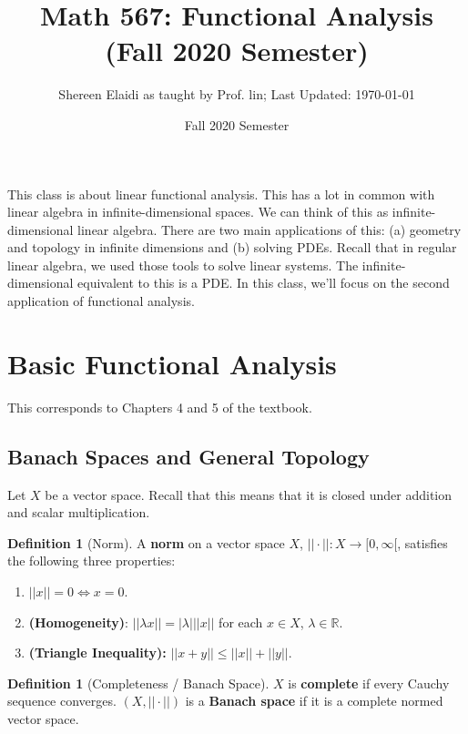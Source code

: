 \documentclass[psamsfonts]{amsart}
\title[Math 567: Functional Analysis]{Math 567: Functional Analysis (Fall 2020 Semester)}
\author{Shereen Elaidi as taught by Prof. lin; Last Updated: \today}
\date{Fall 2020 Semester}
\theoremstyle{definition}
\newtheorem{defn}[thm]{Definition}
\theoremstyle{remark}
\newcommand{\R}[0]{\mathbb{R}}
\numberwithin{equation}{section}
\begin{document}
\maketitle

This class is about linear functional analysis. This has a lot in common with linear algebra in infinite-dimensional spaces. We can think of this as infinite-dimensional linear algebra. There are two main applications of this: (a) geometry and topology in infinite dimensions and (b) solving PDEs. Recall that in regular linear algebra, we used those tools to solve linear systems. The infinite-dimensional equivalent to this is a PDE. In this class, we'll focus on the second application of functional analysis.


\section{Basic Functional Analysis}
This corresponds to Chapters 4 and 5 of the textbook.
\subsection{Banach Spaces and General Topology}
Let \( X \) be a vector space. Recall that this means that it is closed under addition and scalar multiplication. 

\begin{defn}[Norm]
	A \textbf{norm} on a vector space \( X \), \( || \cdot ||: X \rightarrow [0, \infty [ \), satisfies the following three properties: 
	\begin{enumerate}
		\item \( || x || = 0 \iff x = 0 \). 
		\item \textbf{(Homogeneity)}: \( || \lambda x || = |\lambda | || x || \) for each \( x \in X \), \( \lambda \in \R \).
		\item \textbf{(Triangle Inequality):} \( || x+y || \leq || x || + || y || \).
	\end{enumerate}
\end{defn}

\begin{defn}[Completeness / Banach Space]
	\( X \) is \textbf{complete} if every Cauchy sequence converges. \( (X, || \cdot ||) \) is a \textbf{Banach space} if it is a complete normed vector space.
\end{defn}
\end{document}
